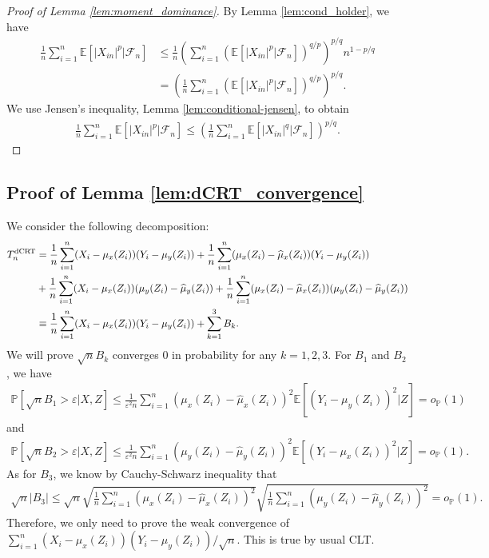 \documentclass[12pt]{article}
\theoremstyle{definition}
\def\P{\mathbb{P}}
\def\P{\mathbb{P}}
\newcommand{\E}{\mathbb E}								%
\renewcommand{\P}{\mathbb{P}}							%
\newcommand{\srx}{X}									%
\newcommand{\srz}{Z}									%
\newcommand{\sry}{Y}									%
\newcommand{\dCRT}{\textnormal{dCRT}} 					%
\begin{document}
\begin{proof}[Proof of Lemma \ref{lem:moment_dominance}]
  By Lemma \ref{lem:cond_holder}, we have
  \begin{align*}
    \frac{1}{n}\sum_{i=1}^n \E[|X_{in}|^{p}|\mathcal{F}_n]
    &
    \leq 
    \frac{1}{n}\left(\sum_{i=1}^n \left(\E[|X_{in}|^{p}|\mathcal{F}_n]\right)^{q/p}\right)^{p/q}n^{1-p/q}\\
    &
    =\left(\frac{1}{n}\sum_{i=1}^n \left(\E[|X_{in}|^{p}|\mathcal{F}_n]\right)^{q/p}\right)^{p/q}.
  \end{align*}
  We use Jensen's inequality, Lemma \ref{lem:conditional-jensen}, to obtain
  \begin{align*}
    \frac{1}{n}\sum_{i=1}^n \E[|X_{in}|^{p}|\mathcal{F}_n]\leq \left(\frac{1}{n}\sum_{i=1}^n \E[|X_{in}|^{q}|\mathcal{F}_n]\right)^{p/q}.
  \end{align*}
\end{proof}

\subsection{Proof of Lemma \ref{lem:dCRT_convergence}}

We consider the following decomposition:
\begin{align*}
  T_n^{\dCRT}
  &
  =\frac{1}{n}\sum_{i=1}^n (\srx_i-\mu_x(\srz_i))(\sry_i-\mu_y(\srz_i)) + \frac{1}{n}\sum_{i=1}^n (\mu_{x}(\srz_i)-\widehat{\mu}_{x}(\srz_i))(\sry_i-\mu_{y}(\srz_i))\\
  &
  + \frac{1}{n}\sum_{i=1}^n (\srx_i-\mu_{x}(\srz_i))(\mu_{y}(\srz_i)-\widehat{\mu}_{y}(\srz_i))+\frac{1}{n}\sum_{i=1}^n (\mu_{x}(\srz_i)-\widehat{\mu}_{x}(\srz_i))(\mu_{y}(\srz_i)-\widehat{\mu}_{y}(\srz_i))\\
  &
  \equiv \frac{1}{n}\sum_{i=1}^n (\srx_i-\mu_x(\srz_i))(\sry_i-\mu_y(\srz_i))+\sum_{k=1}^3B_k.
\end{align*}
We will prove $\sqrt{n}B_k$ converges $0$ in probability for any $k=1,2,3$. For $B_1$ and $B_2$, we have 
\begin{align*}
  \P\left[\sqrt{n}B_1>\varepsilon|\srx,\srz\right]\leq \frac{1}{\varepsilon^2n}\sum_{i=1}^n (\mu_{x}(\srz_i)-\widehat{\mu}_{x}(\srz_i))^2\E[(\sry_i-\mu_{y}(\srz_i))^2|\srz]=o_{\P}(1)
\end{align*}
and 
\begin{align*}
  \P\left[\sqrt{n}B_2>\varepsilon|\srx,\srz\right]\leq \frac{1}{\varepsilon^2n}\sum_{i=1}^n (\mu_{y}(\srz_i)-\widehat{\mu}_{y}(\srz_i))^2\E[(\sry_i-\mu_{x}(\srz_i))^2|\srz]=o_{\P}(1).
\end{align*}
As for $B_3$, we know by Cauchy-Schwarz inequality that
\begin{align*}
  \sqrt{n}|B_3|\leq \sqrt{n}\sqrt{\frac{1}{n}\sum_{i=1}^n (\mu_{x}(\srz_i)-\widehat{\mu}_{x}(\srz_i))^2}\sqrt{\frac{1}{n}\sum_{i=1}^n (\mu_{y}(\srz_i)-\widehat{\mu}_{y}(\srz_i))^2}=o_{\P}(1).
\end{align*}
Therefore, we only need to prove the weak convergence of $\sum_{i=1}^n (\srx_i-\mu_x(\srz_i))(\sry_i-\mu_y(\srz_i))/\sqrt{n}$. This is true by usual CLT.
\end{document}
